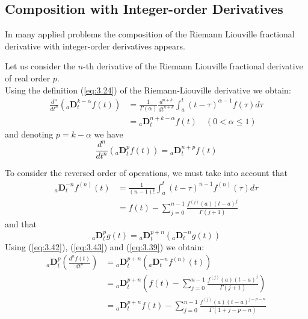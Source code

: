 \documentclass[a4paper,14pt,oneside]{book}
\theoremstyle{plain}
\theoremstyle{definition}
\theoremstyle{remark}
\begin{document}
\begin{center}
\begin{flushleft}
{\section{Composition with Integer-order Derivatives }
In many applied problems the composition of the Riemann Liouville fractional derivative with integer-order derivatives appears.
\par Let us consider the $n$-th derivative of the Riemann Liouville fractional derivative of real order $p$.\\
Using the definition (\ref{eq:3.24}) of the Riemann-Liouville derivative we obtain:
\begin{align}\label{eq:3.40}
\frac{d^{n}}{d t^{n}}\left({ }_{a} \mathbf{D}_{t}^{k-\alpha} f(t)\right)&=\frac{1}{\Gamma(\alpha)} \frac{d^{n+k}}{d t^{n+k}} \int_{a}^{t}(t-\tau)^{\alpha-1} f(\tau) d \tau\nonumber\\
&={ }_{a} \mathbf{D}_{t}^{n+k-\alpha} f(t) \quad{(0<\alpha \leq 1)}
\end{align}
and denoting $p=k-\alpha$ we have
\begin{equation}\label{eq:3.41}
\frac{d^{n}}{d t^{n}}\left({ }_{a} \mathbf{D}_{t}^{p} f(t)\right)={ }_{a} \mathbf{D}_{t}^{n+p} f(t)
\end{equation}
\par To consider the reversed order of operations, we must take into account that
\begin{align}\label{eq:3.42}
{ }_{a} \mathbf{D}_{t}^{-n} f^{(n)}(t) &=\frac{1}{(n-1) !} \int_{a}^{t}(t-\tau)^{n-1} f^{(n)}(\tau) d{\tau}\nonumber\\
&=f(t)-\sum_{j=0}^{n-1} \frac{f^{(j)}(a)(t-a)^{j}}{\Gamma(j+1)}
\end{align}
and that
\begin{equation}\label{eq:3.43}
{ }_{a} \mathbf{D}_{t}^{p} g(t)={ }_{a} \mathbf{D}_{t}^{p+n}\left({ }_{a} \mathbf{D}_{t}^{-n} g(t)\right)
\end{equation}
Using (\ref{eq:3.42}), (\ref{eq:3.43}) and (\ref{eq:3.39}) we obtain:
\begin{align}\label{eq:3.44}
{ }_{a} \mathbf{D}_{t}^{p}\left(\frac{d^{n} f(t)}{d t^{n}}\right) &={ }_{a} \mathbf{D}_{t}^{p+n}\left({ }_{a} \mathbf{D}_{t}^{-n} f^{(n)}(t)\right)\nonumber \\
&={ }_{a} \mathbf{D}_{t}^{p+n}\left(f(t)-\sum_{j=0}^{n-1} \frac{f^{(j)}(a)(t-a)^{j}}{\Gamma(j+1)}\right)\nonumber \\
&={ }_{a} \mathbf{D}_{t}^{p+n} f(t)-\sum_{j=0}^{n-1} \frac{f^{(j)}(a)(t-a)^{j-p-n}}{\Gamma(1+j-p-n)}
\end{align}
}
\end{flushleft}
\end{center}
\end{document}
